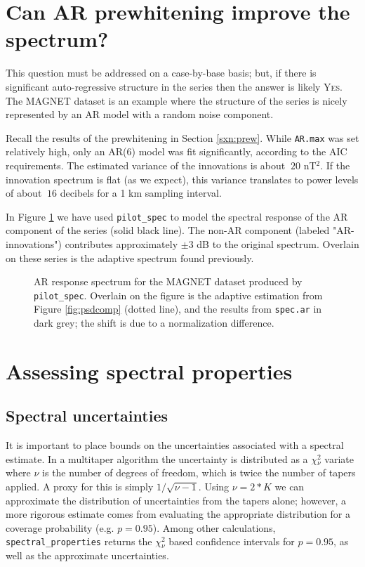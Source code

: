 \documentclass[10pt]{article}\usepackage[]{graphicx}\usepackage[]{color}
\newcommand{\SC}[1]{\textsc{#1}}
\newcommand{\Rcmd}[1]{\texttt{#1}}
\begin{document}
\section{Can AR prewhitening improve the spectrum?}

This question must be addressed on a case-by-base basis; but, if there
is significant auto-regressive structure in the series then
the answer is likely \SC{Yes}.  
The MAGNET dataset is an example where the structure of the series
is nicely represented by an AR model with a random noise component.

Recall the results of the prewhitening in Section \ref{sxn:prew}.
While \Rcmd{AR.max} was set relatively high,
only an AR(6) model was fit significantly, according to the AIC requirements. 
The estimated variance of the innovations is about $~20$ nT$^2$.
If the innovation spectrum is flat (as we expect), this variance translates to power levels
of about $~16$ decibels for a 1 km sampling interval.  



In Figure \ref{fig:arspecvar} we have used \Rcmd{pilot\_spec} to 
model the spectral response of the AR component of the series (solid
black line). The non-AR component (labeled "AR-innovations")
contributes approximately $\pm 3$ dB to the original spectrum.
Overlain on these series is the adaptive spectrum found previously.

\begin{figure}[!htbp]
\begin{center}

\caption{AR response spectrum for the MAGNET dataset produced by 
\Rcmd{pilot\_spec}. Overlain on the figure is the adaptive estimation 
from Figure \ref{fig:psdcomp} (dotted line),
and the results from \Rcmd{spec.ar} in dark grey; the shift is due to a
normalization difference.}
\label{fig:arspecvar}
\end{center}
\end{figure}

\clearpage

\section{Assessing spectral properties}
\subsection{Spectral uncertainties}
It is important to place bounds on the uncertainties associated
with a spectral estimate. In a multitaper algorithm the uncertainty is distributed as
a $\chi{}_{\nu}^2$ variate where $\nu$ is the number of degrees of freedom, which is twice the
number of tapers applied. A proxy for this is simply $1/\sqrt{\nu - 1}$.
Using $\nu = 2*K$ we can approximate the distribution
of uncertainties from the tapers alone; however, a more
rigorous estimate comes from evaluating the appropriate 
distribution  for a coverage probability (e.g. $p=0.95$).
Among other calculations, \Rcmd{spectral\_properties} returns the 
$\chi{}_{\nu}^2$ based confidence intervals for $p=0.95$, as well as the
approximate uncertainties.  
\end{document}

